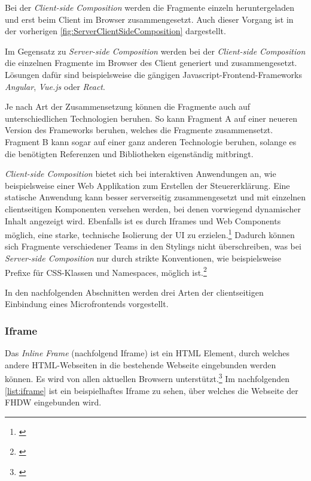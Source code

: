 Bei der \textit{Client-side Composition} werden die Fragmente einzeln heruntergeladen und erst beim Client im Browser zusammengesetzt. Auch dieser Vorgang ist in der vorherigen \cref{fig:ServerClientSideComposition} dargestellt.

Im Gegensatz zu \textit{Server-side Composition} werden bei der \textit{Client-side Composition} die einzelnen Fragmente im Browser des Client generiert und zusammengesetzt. Lösungen dafür sind beispielsweise die gängigen Javascript-Frontend-Frameworks \textit{Angular}, \textit{Vue.js} oder \textit{React}.

Je nach Art der Zusammensetzung können die Fragmente auch auf unterschiedlichen Technologien beruhen. So kann Fragment A auf einer neueren Version des Frameworks beruhen, welches die Fragmente zusammensetzt. Fragment B kann sogar auf einer ganz anderen Technologie beruhen, solange es die benötigten Referenzen und Bibliotheken eigenständig mitbringt.

\textit{Client-side Composition} bietet sich bei interaktiven Anwendungen an, wie beispielsweise einer Web Applikation zum Erstellen der Steuererklärung. Eine statische Anwendung kann besser serverseitig zusammengesetzt und mit einzelnen clientseitigen Komponenten versehen werden, bei denen vorwiegend dynamischer Inhalt angezeigt wird.\newline
Ebenfalls ist es durch Iframes und Web Components möglich, eine starke, technische Isolierung der \gls{UI} zu erzielen.\footnote{\cite[vgl.][97]{Geers2020}} Dadurch können sich Fragmente verschiedener Teams in den Stylings nicht überschreiben, was bei \textit{Server-side Composition} nur durch strikte Konventionen, wie beispielsweise Prefixe für CSS-Klassen und Namespaces, möglich ist.\footnote{\cite[vgl.][83]{Geers2020}}

In den nachfolgenden Abschnitten werden drei Arten der clientseitigen Einbindung eines Microfrontends vorgestellt.

\subsubsection{Iframe}\label{sec:IFrame}

Das \textit{Inline Frame} (nachfolgend Iframe) ist ein \gls{HTML} Element, durch welches andere HTML-Webseiten in die bestehende Webseite eingebunden werden können. Es wird von allen aktuellen Browsern unterstützt.\footnote{\cite[vgl.][]{MDNWebDocs2021a}}
Im nachfolgenden \cref{list:iframe} ist ein beispielhaftes Iframe zu sehen, über welches die Webseite der \gls{FHDW} eingebunden wird.

